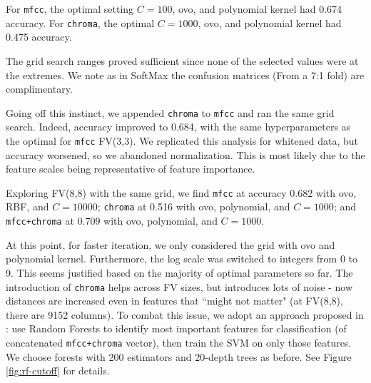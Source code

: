 \documentclass[9pt]{article}
\begin{document}
For \texttt{mfcc}, the optimal setting $C=100$, ovo, and polynomial kernel had 0.674 accuracy.
For \texttt{chroma}, the optimal $C=1000$, ovo, and polynomial kernel had 0.475 accuracy.

The grid search ranges proved sufficient since none of the selected values were at the extremes. We note as in SoftMax the confusion matrices (From a 7:1 fold) are complimentary.

Going off this instinct, we appended \texttt{chroma} to \texttt{mfcc} and ran the same grid search. Indeed, accuracy improved to 0.684, with the same hyperparameters as the optimal for \texttt{mfcc} FV(3,3). We replicated this analysis for whitened data, but accuracy worsened, so we abandoned normalization. This is most likely due to the feature scales being representative of feature importance.

Exploring FV(8,8) with the same grid, we find \texttt{mfcc} at accuracy 0.682 with ovo, RBF, and $C=10000$; \texttt{chroma} at 0.516 with ovo, polynomial, and $C=1000$; and \texttt{mfcc+chroma} at 0.709 with ovo, polynomial, and $C=1000$.

At this point, for faster iteration, we only considered the grid with ovo and polynomial kernel. Furthermore, the log scale was switched to integers from 0 to 9. This seems justified based on the majority of optimal parameters so far. The introduction of \texttt{chroma} helps across FV sizes, but introduces lots of noise - now distances are increased even in features that ``might not matter" (at FV(8,8), there are 9152 columns). To combat this issue, we adopt an approach proposed in \cite{vox}: use Random Forests to identify most important features for classification (of concatenated \texttt{mfcc+chroma} vector), then train the SVM on only those features. We choose forests with 200 estimators and 20-depth trees as before. See Figure \ref{fig:rf-cutoff} for details.
\end{document}
